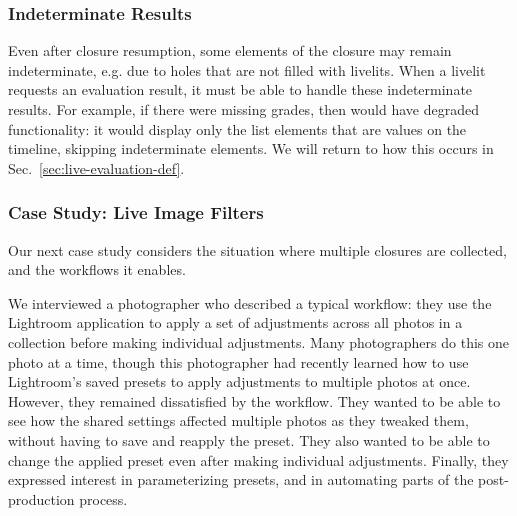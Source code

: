 
\subsubsection{Indeterminate Results}
Even after closure resumption, some elements of the closure may remain indeterminate, e.g. due to holes that
are not filled with livelits.
When a livelit requests an evaluation result, it must be able to handle these indeterminate results.
For example, if there were missing grades,
then  would have degraded functionality:
it would display only the list elements that are values on the timeline, skipping indeterminate elements.
We will return to how this occurs in Sec.~\ref{sec:live-evaluation-def}.



\subsubsection{Case Study: Live Image Filters}\label{sec:image-transformation}
Our next case study
considers the situation where multiple closures are collected, and
the workflows it enables.

We interviewed a photographer
who described a typical workflow:
they use the Lightroom application to
apply a set of adjustments
across all photos in a collection before making
individual adjustments.
Many photographers do this one photo at a time,
though this photographer had recently learned how to
use Lightroom's saved presets to
apply adjustments to multiple photos at once.
However, they remained dissatisfied by the workflow.
They wanted to be able to see how the shared settings affected
multiple photos as they tweaked them, without having to
save and reapply the preset.
They also wanted to be able to change the applied preset
even after making individual adjustments.
Finally, they
expressed interest in parameterizing
presets, and in automating parts of the post-production process.




